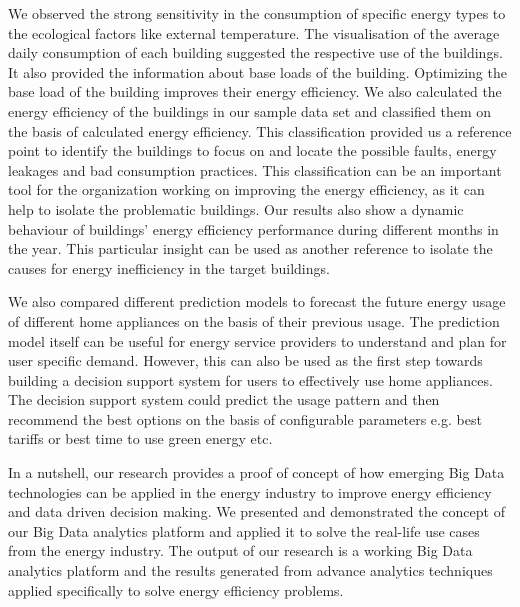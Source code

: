 We observed the strong sensitivity in the consumption of specific energy types to the ecological factors like external temperature. The visualisation of the average daily consumption of each building suggested the respective use of the buildings. It also provided the information about base loads of the building. Optimizing the base load of the building improves their energy efficiency. We also calculated the energy efficiency of the buildings in our sample data set and classified them on the basis of calculated energy efficiency. This classification provided us a reference point to identify the buildings to focus on and locate the possible faults, energy leakages and bad consumption practices. This classification can be an important tool for the organization working on improving the energy efficiency, as it can help to isolate the problematic buildings. Our results also show a dynamic behaviour of buildings' energy efficiency performance during different months in the year. This particular insight can be used as another reference to isolate the causes for energy inefficiency in the target buildings.

We also compared different prediction models to forecast the future energy usage of different home appliances on the basis of their previous usage. The prediction model itself can be useful for energy service providers to understand and plan for user specific demand. However, this can also be used as the first step towards building a decision support system for users to effectively use home appliances. The decision support system could predict the usage pattern and then recommend the best options on the basis of configurable parameters e.g. best tariffs or best time to use green energy etc. 

In a nutshell, our research provides a proof of concept of how emerging Big Data technologies can be applied in the energy industry to improve energy efficiency and data driven decision making. We presented and demonstrated the concept of our Big Data analytics platform and applied it to solve the real-life use cases from the energy industry. The output of our research is a working Big Data analytics platform and the results generated from advance analytics techniques applied specifically to solve energy efficiency problems.  
     

